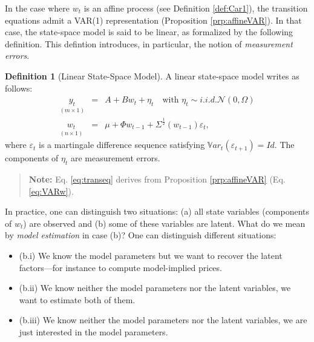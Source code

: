 \documentclass[
  12pt,
]{book}
\providecommand{\tightlist}{%
  \setlength{\itemsep}{0pt}\setlength{\parskip}{0pt}}
\theoremstyle{definition}
\newtheorem{definition}{Definition}[chapter]
\theoremstyle{definition}
\theoremstyle{definition}
\theoremstyle{definition}
\theoremstyle{remark}
\begin{document}
In the case where \(w_t\) is an affine process (see Definition \ref{def:Car1}), the transition equations admit a VAR(1) representation (Proposition \ref{prp:affineVAR}). In that case, the state-space model is said to be linear, as formalized by the following definition. This defintion introduces, in particular, the notion of \emph{measurement errors}.

\begin{definition}[Linear State-Space Model]
\protect\hypertarget{def:LSSM}{}\label{def:LSSM}A linear state-space model writes as follows:
\begin{eqnarray}
\underset{(m \times 1)}{y_t}  &=& A + Bw_t + \eta_t  \quad \mbox{with }  \eta_t \sim i.i.d. \mathcal{N}(0,\Omega) \label{eq:measeq} \\
\underset{(n \times 1)}{w_t} & =& \mu + \Phi w_{t-1} + \Sigma^{\frac{1}{2}}(w_{t-1}) \varepsilon_t,\label{eq:transeq}
\end{eqnarray}
where \(\varepsilon_t\) is a martingale difference sequence satisfying \(\mathbb{V}ar_t(\varepsilon_{t+1}) = Id\). The components of \(\eta_t\) are measurement errors.
\end{definition}

\begin{quote}
\textbf{Note:} Eq. \eqref{eq:transeq} derives from Proposition \ref{prp:affineVAR} (Eq. \eqref{eq:VARw}).
\end{quote}

In practice, one can distinguish two situations: (a) all state variables (components of \(w_t\)) are observed and (b) some of these variables are latent. What do we mean by \emph{model estimation} in case (b)? One can distinguish different situations:

\begin{itemize}
\tightlist
\item
  (b.i) We know the model parameters but we want to recover the latent factors---for instance to compute model-implied prices.
\item
  (b.ii) We know neither the model parameters nor the latent variables, we want to estimate both of them.
\item
  (b.iii) We know neither the model parameters nor the latent variables, we are just interested in the model parameters.
\end{itemize}
\end{document}
